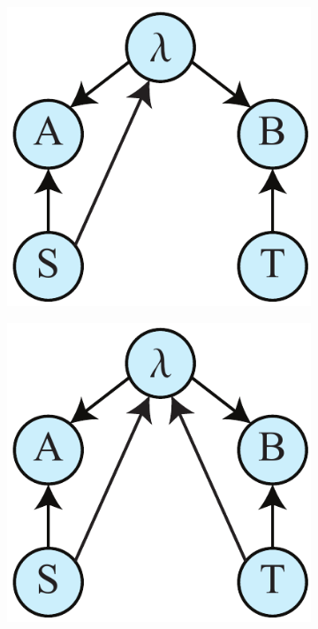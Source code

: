 \documentclass[letterpaper,onecolumn,nofootinbib]{revtex4}
\begin{document}
\begin{figure}[h]
        \begin{subfigure}[b]{0.18\textwidth}
                	\centering
        		\includegraphics[width=\textwidth]{retro-1}
		\subcaption{}
		\label{fig:retroa}
	\end{subfigure}
	\hspace{5em}
        \begin{subfigure}[b]{0.18\textwidth}
                	\centering
        	\includegraphics[width=\textwidth]{retro-3}

\end{subfigure}
\end{figure}
\end{document}
